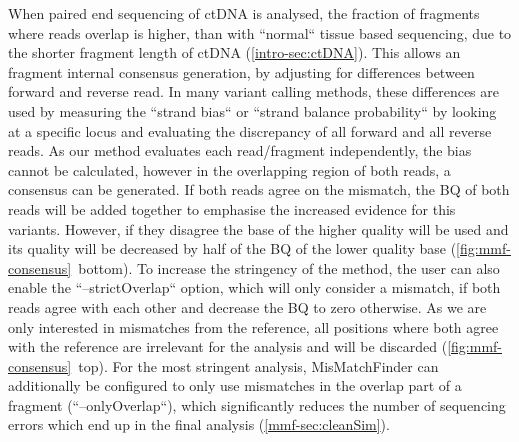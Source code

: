When paired end sequencing of ctDNA is analysed, the fraction of fragments where reads overlap is higher, than with ``normal`` tissue based sequencing, due to the shorter fragment length of ctDNA (\autoref{intro-sec:ctDNA}). This allows an fragment internal consensus generation, by adjusting for differences between forward and reverse read. In many variant calling methods, these differences are used by measuring the ``strand bias`` \cite{Guo2012, Saunders2012, GATKTeam2019} or ``strand balance probability`` \cite{Garrison2012} by looking at a specific locus and evaluating the discrepancy of all forward and all reverse reads. As our method evaluates each read/fragment independently, the bias cannot be calculated, however in the overlapping region of both reads, a consensus can be generated. If both reads agree on the mismatch, the BQ of both reads will be added together to emphasise the increased evidence for this variants. However, if they disagree the base of the higher quality will be used and its quality will be decreased by half of the BQ of the lower quality base (\autoref{fig:mmf-consensus}~bottom). To increase the stringency of the method, the user can also enable the ``--strictOverlap`` option, which will only consider a mismatch, if both reads agree with each other and decrease the BQ to zero otherwise. As we are only interested in mismatches from the reference, all positions where both agree with the reference are irrelevant for the analysis and will be discarded (\autoref{fig:mmf-consensus}~top). For the most stringent analysis, MisMatchFinder can additionally be configured to only use mismatches in the overlap part of a fragment (``--onlyOverlap``), which significantly reduces the number of sequencing errors which end up in the final analysis (\autoref{mmf-sec:cleanSim}).

